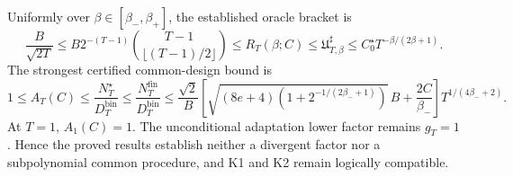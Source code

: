 Uniformly over \(\beta\in[\beta_-,\beta_+]\), the established oracle bracket is \[\frac{B}{\sqrt{2T}}\le B2^{-(T-1)}\binom{T-1}{\lfloor(T-1)/2\rfloor}\le R_T(\beta;C)\le\mathfrak U_{T,\beta}^{\sharp}\le C_0^\star T^{-\beta/(2\beta+1)}.\] The strongest certified common-design bound is \[1\le A_T(C)\le\frac{N_T^\star}{D_T^{\mathrm{bin}}}\le\frac{N_T^{\mathrm{fin}}}{D_T^{\mathrm{bin}}}\le\frac{\sqrt2}{B}\left[\sqrt{(8e+4)\left(1+2^{-1/(2\beta_-+1)}\right)}\,B+\frac{2C}{\beta_-}\right]T^{1/(4\beta_-+2)}.\] At \(T=1\), \(A_1(C)=1\). The unconditional adaptation lower factor remains \(g_T=1\). Hence the proved results establish neither a divergent factor nor a subpolynomial common procedure, and K1 and K2 remain logically compatible.
